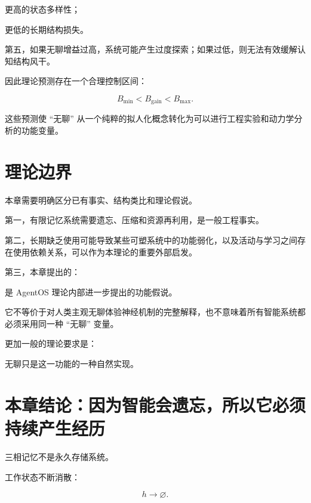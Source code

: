 更高的状态多样性；

更低的长期结构损失。

第五，如果无聊增益过高，系统可能产生过度探索；如果过低，则无法有效缓解认知结构风干。

因此理论预测存在一个合理控制区间：

\[
\boxed{
B_{\min}
<
B_{\mathrm{gain}}
<
B_{\max}.
}
\]

这些预测使 ``无聊'' 从一个纯粹的拟人化概念转化为可以进行工程实验和动力学分析的功能变量。

\section{理论边界}

本章需要明确区分已有事实、结构类比和理论假说。

第一，有限记忆系统需要遗忘、压缩和资源再利用，是一般工程事实。

第二，长期缺乏使用可能导致某些可塑系统中的功能弱化，以及活动与学习之间存在使用依赖关系，可以作为本理论的重要外部启发。

第三，本章提出的：

\begin{statementbox}
\centering
{}
\end{statementbox}

是 AgentOS 理论内部进一步提出的功能假说。

它不等价于对人类主观无聊体验神经机制的完整解释，也不意味着所有智能系统都必须采用同一种 ``无聊'' 变量。

更加一般的理论要求是：

\begin{statementbox}
\centering
{}
\end{statementbox}

无聊只是这一功能的一种自然实现。

\section{本章结论：因为智能会遗忘，所以它必须持续产生经历}

三相记忆不是永久存储系统。

工作状态不断消散：

\[
h\rightarrow\varnothing.
\]

